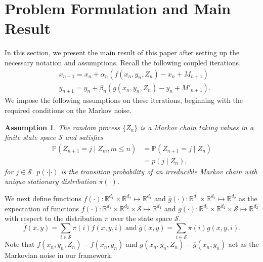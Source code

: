 \documentclass[letterpaper, 10 pt, conference]{ieeeconf}  %
\theoremstyle{definition}
\theoremstyle{plain}
\newtheorem{assumption}{Assumption}
\newcommand{\barf}{\overline{f}}
\newcommand{\barg}{\overline{g}}
\newcommand{\Scal}{\mathcal{S}}
\newcommand{\RR}{\mathbb{R}}
\newcommand{\PP}{\mathbb{P}}
\begin{document}
\section{Problem Formulation and Main Result}\label{sec:main}
In this section, we present the main result of this paper after setting up the necessary notation and assumptions. Recall the following coupled iterations.
\begin{equation}\label{iter-main}
    \begin{aligned}
&x_{n+1}=x_n+\alpha_n (f(x_n,y_n,Z_n)-x_n+M_{n+1})\\
&y_{n+1}=y_n+\beta_n (g(x_n,y_n,Z_n)-y_n+M'_{n+1}).
\end{aligned}
\end{equation}
We impose the following assumptions on these iterations, beginning with the required conditions on the Markov noise.
\begin{assumption}\label{assu-Markov}
    The random process $\{Z_n\}$ is a Markov chain taking values in a finite state space $\Scal$ and satisfies
    \begin{align*}
        \PP(Z_{n+1}=j\mid Z_m, m\leq n)&=\PP(Z_{n+1}=j\mid Z_n)\\
        &=p(j\mid Z_n),
    \end{align*}
    for $j\in\Scal$. $p(\cdot|\cdot)$ is the transition probability of an irreducible Markov chain with unique stationary distribution $\pi(\cdot)$.
\end{assumption}
We next define functions $\barf(\cdot):\RR^{d_1}\times\RR^{d_2}\mapsto\RR^{d_1}$ and $\barg(\cdot):\RR^{d_1}\times\RR^{d_2}\mapsto\RR^{d_2}$ as the expectation of functions $f(\cdot):\RR^{d_1}\times\RR^{d_2}\times\Scal\mapsto\RR^{d_1}$ and $g(\cdot):\RR^{d_1}\times\RR^{d_2}\times\Scal\mapsto\RR^{d_2}$ with respect to the distribution $\pi$ over the state space $\Scal$. 
$$\barf(x,y)=\sum_{i\in\Scal}\pi(i)f(x,y,i) \; \textrm{and} \; \barg(x,y)=\sum_{i\in\Scal}\pi(i)g(x,y,i).$$
Note that $f(x_n,y_n,Z_n)-\barf(x_n,y_n)$ and $g(x_n,y_n,Z_n)-\barg(x_n,y_n)$ act as the Markovian noise in our framework.
\end{document}
